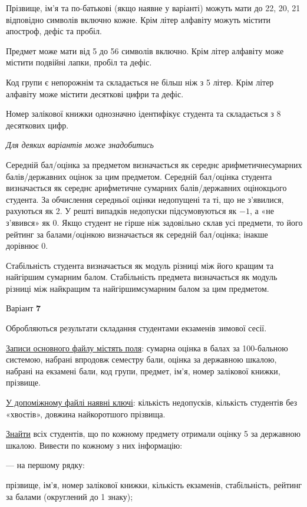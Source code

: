 \documentclass[11pt, ukrainian]{article}
\begin{document}
Прізвище, ім’я та по-батькові (якщо наявне у варіанті) можуть мати до 22, 20, 21 відповідно символів включно кожне. 
Крім літер алфавіту можуть містити апостроф, дефіс та пробіл.

Предмет може мати від 5 до 56 символів включно. 
Крім літер алфавіту може містити подвійні лапки, пробіл та дефіс.

Код групи є непорожнім та складається не більш ніж з 5 літер. 
Крім літер алфавіту може містити десяткові цифри та дефіс.


Номер залікової книжки однозначно ідентифікує студента та складається з 8 десяткових цифр. 

\bigskip\textit{Для деяких варіантів може знадобитись}

Середній бал/оцінка за предметом визначається як середнє арифметичнесумарних балів/державних оцінок за цим предметом. 
Середній бал/оцінка студента визначається як середнє арифметичне сумарних балів/державних оцінокцього студента. 
За обчислення середньої оцінки недопущені та ті, що не з’явилися, рахуються як 2.
У решті випадків недопуски підсумовуються як $-1$, а «не з’явився» як 0.
Якщо студент не гірше ніж задовільно склав усі предмети, 
то його рейтинг за балами/оцінкою визначається як середній бал/оцінка; інакше дорівнює 0.

Стабільність студента визначається як модуль різниці між його кращим та найгіршим сумарним балом.
Стабільність предмета визначається як модуль різниці між найкращим та найгіршимсумарним балом за цим предметом.




\par
\newpage
{\center Варіант  \No \textbf { 7 }\par}
\bigskip
Обробляються результати складання студентами екзаменів зимової сесії.

\underline{Записи основного файлу містять поля}: сумарна оцінка в балах за 100-бальною системою, набрані впродовж семестру бали, оцінка за державною шкалою, набрані на екзамені бали, код групи, предмет, ім’я, номер залікової книжки, прізвище.

\underline{У допоміжному файлі наявні ключі}: кількість недопусків, кількість студентів без «хвостів», довжина найкоротшого прізвища.

\underline{Знайти} всіх студентів, що по кожному предмету отримали оцінку 5 за державною шкалою. Вивести по кожному з них інформацію:\par
{\noindent}--- на першому рядку:\par
прізвище, ім’я, номер залікової книжки, кількість екзаменів, стабільність, рейтинг за балами (округлений до 1 знаку);
\end{document}

